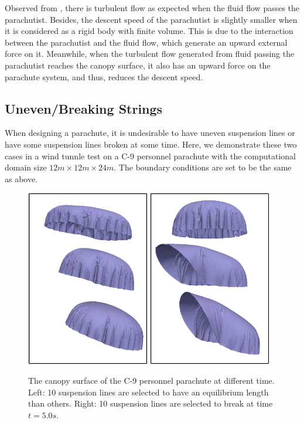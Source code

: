 Observed from , there is turbulent flow as 
expected when the fluid flow passes the parachutist. 
Besides, the descent speed of the parachutist is slightly smaller when it is considered as a rigid body with finite volume. 
This is due to the interaction between the parachutist and the fluid flow, 
which generate an upward external force on it. 
Meanwhile, when the turbulent flow generated from fluid passing the 
parachutist reaches the canopy surface, it also has an upward force on the 
parachute system, and thus, reduces the descent speed.

\subsection{Uneven/Breaking Strings}
When designing a parachute, it is undesirable to have uneven suspension
lines or have some suspension lines broken at some time.
Here, we demonstrate these two cases in a wind tunnle test on a C-9 personnel
parachute with the computational domain size $12 m\times12 m\times24 m$.
The boundary conditions are set to be the same as above.
\begin{figure}[!ht]
\centering
\includegraphics[width=0.48\textwidth]{figures/uneven}
\includegraphics[width=0.48\textwidth]{figures/break}
\caption{The canopy surface of the C-9 personnel parachute at different time.
Left: 10 suspension lines are selected to have an equilibrium length than
others. Right: 10 suspension lines are selected to break at time $t = 5.0s$.}
\label{fig:uneven_break}
\end{figure}
